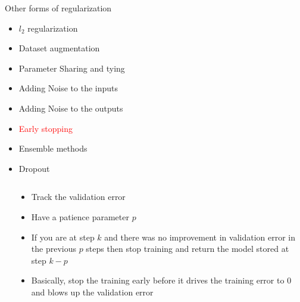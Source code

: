 \begin{frame}
\end{frame}

\begin{frame}
	\vspace{4em}
	\begin{overlayarea}{\textwidth}{\textheight}
		\begin{block}{Other forms of regularization}
			\begin{itemize}
				\item $l_2$ regularization
				\item Dataset augmentation
				\item Parameter Sharing and tying
				\item Adding Noise to the inputs
				\item Adding Noise to the outputs 
				\item \textcolor<2->{red}{Early stopping}
				\item Ensemble methods
				\item Dropout
			\end{itemize}
		\end{block}
	\end{overlayarea}
\end{frame}


\begin{frame}
	\begin{columns}
		\begin{overlayarea}{\textwidth}{\textheight}
			\only<1->{
				\begin{figure}
					
				\end{figure}
			}
		\end{overlayarea}
		\begin{overlayarea}{\textwidth}{\textheight}
			\begin{itemize}
				\justifying
				\item<1-> Track the validation error
				\item<2-> Have a patience parameter $p$
				\item <3-> If you are at step $k$ and there was no improvement in validation error in the previous $p$ steps then stop training and return the model stored at step $k-p$
				\item <4-> Basically, stop the training early before it drives the training error to $0$ and blows up the validation error
			\end{itemize}
		\end{overlayarea}
	\end{columns}
\end{frame}

